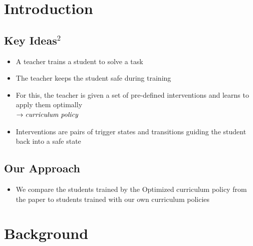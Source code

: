 \documentclass[a0,portrait]{a0poster}
\begin{document}
\begin{multicols}{3} %


\section{Introduction}
\setlength{\parindent}{0pt}  %
\large

\subsection{Key Ideas$^\text{2}$}

\begin{itemize}
    \item A teacher trains a student to solve a task
    \item The teacher keeps the student safe during training
    \item For this, the teacher is given a set of pre-defined interventions and learns to apply them optimally\\$\rightarrow\emph{curriculum policy}$
    \item Interventions are pairs of trigger states and transitions guiding the student back into a safe state
\end{itemize}

\subsection{Our Approach}

\begin{itemize}
    \item We compare the students trained by the Optimized curriculum policy from the paper \cite{Turchetta2020SafeRL} to students trained with our own curriculum policies
\end{itemize}


\section{Background}


\end{multicols}
\end{document}

